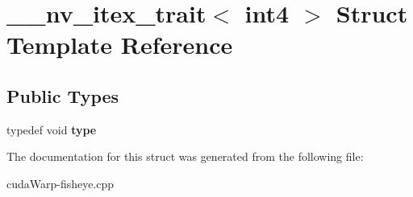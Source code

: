 \hypertarget{struct____nv__itex__trait_3_01int4_01_4}{}\section{\+\_\+\+\_\+nv\+\_\+itex\+\_\+trait$<$ int4 $>$ Struct Template Reference}
\label{struct____nv__itex__trait_3_01int4_01_4}
\subsection*{Public Types}
\begin{DoxyCompactItemize}
\item 
typedef void {\bfseries type}\hypertarget{struct____nv__itex__trait_3_01int4_01_4_a66996e8ace5fd1c049265fc18416ac9d}{}\label{struct____nv__itex__trait_3_01int4_01_4_a66996e8ace5fd1c049265fc18416ac9d}

\end{DoxyCompactItemize}


The documentation for this struct was generated from the following file\+:\begin{DoxyCompactItemize}
\item 
cuda\+Warp-\/fisheye.\+cpp\end{DoxyCompactItemize}
